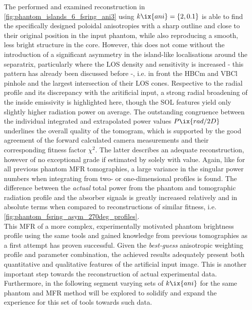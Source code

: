             The performed and examined reconstruction in \cref{fig:phantom_islands_6_fsring_ani3} using $k\ix{ani}=\left\{2, 0.1\right\}$ is able to find the specifically designed poloidal anisotropies with a sharp outline and close to their original position in the input phantom, while also reproducing a smooth, less bright structure in the core. However, this does not come without the introduction of a significant asymmetry in the island-like localisations around the separatrix, particularly where the LOS density and sensitivity is increased - this pattern has already been discussed before -, i.e. in front the HBCm and VBCl pinhole and the largest intersection of their LOS cones. Respective to the radial profile and its discrepancy with the aritificial input, a strong radial broadening of the inside emissivity is highlighted here, though the SOL features yield only slightly higher radiation power on average. The outstanding congruence between the individual integrated and extrapolated power values $P\ix{rad/2D}$ underlines the overall quality of the tomogram, which is supported by the good agreement of the forward calculated camera measurements and their corresponding fitness factor $\chi^{2}$. The latter describes an adequate reconstruction, however of no exceptional grade if estimated by solely with value. Again, like for all previous phantom MFR tomographies, a large variance in the singular power numbers when integrating from two- or one-dimensional profiles is found. The difference between the \textit{actual} total power from the phantom and tomographic radiation profile and the absorber signals is greatly increased relatively and in absolute terms when compared to reconstructions of similar fitness, i.e. \cref{fig:phantom_fsring_asym_270deg_profiles}.\\%
            This MFR of a more complex, experimentally motivated phantom brightness profile using the same tools and gained knowledge from previous tomographies as a first attempt has proven successful. Given the \textit{best-guess} anisotropic weighting profile and parameter combination, the achieved results adequately present both quantitative and qualitative features of the artificial input image. This is another important step towards the reconstruction of actual experimental data. Furthermore, in the following segment varying sets of $k\ix{ani}$ for the same phantom and MFR method will be explored to solidify and expand the experience for this set of tools towards such data.%
%
